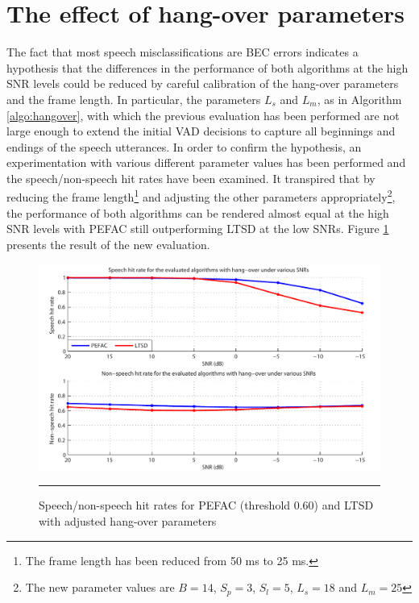 \section{The effect of hang-over parameters}

The fact that most speech misclassifications are BEC errors indicates a hypothesis that the differences in the performance of both algorithms at the high SNR levels could be reduced by careful calibration of the hang-over parameters and the frame length. In particular, the parameters $L_s$ and $L_m$, as in Algorithm \ref{algo:hangover}, with which the previous evaluation has been performed are not large enough to extend the initial VAD decisions to capture all beginnings and endings of the speech utterances. In order to confirm the hypothesis, an experimentation with various different parameter values has been performed and the speech/non-speech hit rates have been examined. It transpired that by reducing the frame length\footnote{The frame length has been reduced from 50 ms to 25 ms.} and adjusting the other parameters appropriately\footnote{The new parameter values are $B=14$, $S_p=3$, $S_l=5$, $L_s=18$ and $L_m=25$}, the performance of both algorithms can be rendered almost equal at the high SNR levels with PEFAC still outperforming LTSD at the low SNRs. Figure \ref{fig:diffhangpars} presents the result of the new evaluation.

\begin{figure}[htbp]
	\centering
		\includegraphics[width=0.9\columnwidth]{Figures/Chapter5/diffhangpars.pdf}
		\rule{37em}{0.5pt}
	\caption[Speech/non-speech hit rates for PEFAC (threshold 0.60) and LTSD with adjusted hang-over parameters]{Speech/non-speech hit rates for PEFAC (threshold 0.60) and LTSD with adjusted hang-over parameters}
	\label{fig:diffhangpars}
\end{figure}

